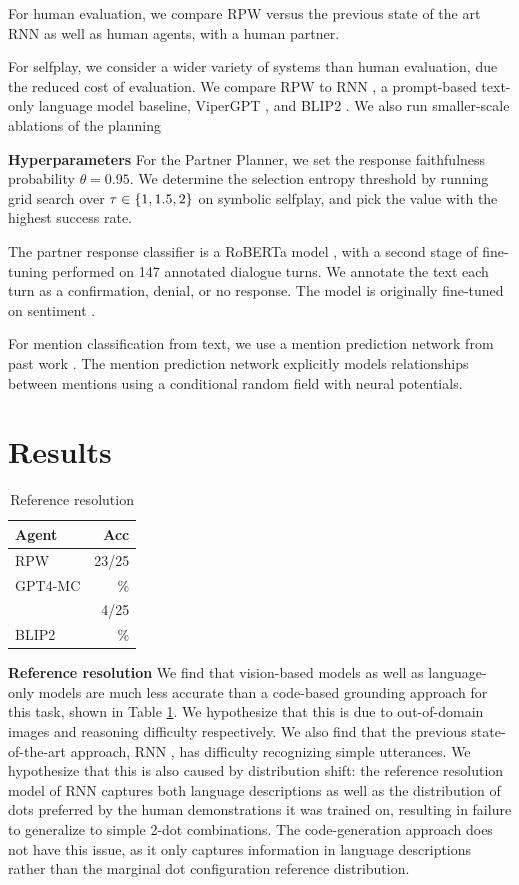 \documentclass[11pt]{article}
\newcommand{\system}{RPW}
\begin{document}
For human evaluation, we compare \system{}
versus the previous state of the art RNN \citep{fried} as well as
human agents, with a human partner.

For selfplay, we consider a wider variety of systems than human evaluation, due the reduced cost of evaluation.
We compare \system{} to RNN \citep{fried},
a prompt-based text-only language model baseline,
ViperGPT \citep{vipergpt},
and BLIP2 \citep{}.
We also run smaller-scale ablations of the planning

\textbf{Hyperparameters}
For the Partner Planner, we set the response faithfulness probability $\theta = 0.95$.
We determine the selection entropy threshold by running grid search over $\tau \in \left\{1,1.5,2\right\}$ on symbolic selfplay, and pick the value with the highest success rate.

The partner response classifier is a RoBERTa model \citep{roberta}, with a second stage of fine-tuning performed on 147 annotated dialogue turns.
We annotate the text each turn as a confirmation, denial, or no response.
The model is originally fine-tuned on sentiment \citep{heitmann2020}.

For mention classification from text, we use a mention prediction network from past work \citep{fried}.
The mention prediction network explicitly models relationships between mentions using a conditional random field with neural potentials.

\section{Results}

\begin{table}[!t]
\centering
\begin{tabular}{lr}
\toprule
Agent                    & Acc\\
\midrule
\system{}                &  23/25 \\
GPT4-MC                  & \%  \\
\citet{fried}            & 4/25  \\
BLIP2                    & \%  \\
\bottomrule
\end{tabular}
\caption{\label{tbl:refres}
Reference resolution
}
\end{table}

\textbf{Reference resolution}
We find that vision-based models as well as 
language-only models are much less accurate than
a code-based grounding approach for this task,
shown in Table \ref{tbl:refres}.
We hypothesize that this is due to out-of-domain images
and reasoning difficulty respectively.
We also find that the previous state-of-the-art approach,
RNN \citep{fried}, has difficulty recognizing simple utterances.
We hypothesize that this is also caused by distribution shift:
the reference resolution model of RNN captures both
language descriptions as well as the distribution of dots
preferred by the human demonstrations it was trained on,
resulting in failure to generalize to simple 2-dot combinations.
The code-generation approach does not have this issue,
as it only captures information in language descriptions
rather than the marginal dot configuration reference distribution.
\end{document}
